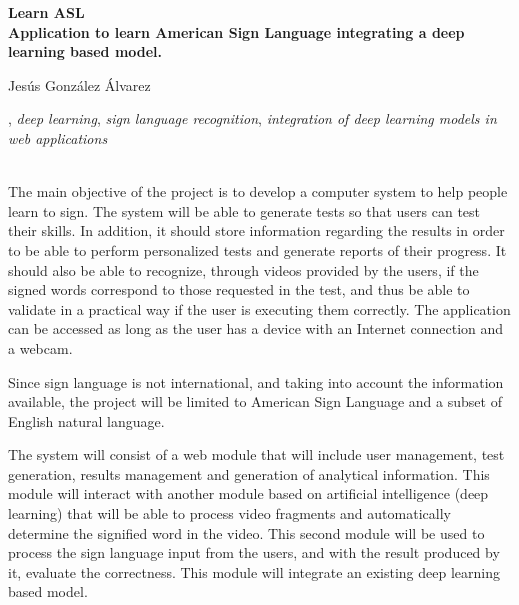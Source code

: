 \thispagestyle{empty}

\begin{center}
{\large\bfseries Learn ASL \\ Application to learn American Sign Language integrating a deep learning based model.}\\
\end{center}
\begin{center}
Jesús González Álvarez\\
\end{center}


\vspace{0.5cm}
, \textit{deep learning}, \textit{sign language recognition}, \textit{integration of deep learning models in web applications}
\vspace{0.7cm}

\\

\bigskip
The main objective of the project is to develop a computer system to help people learn to sign. The system will be able to generate tests so that users can test their skills. In addition, it should store information regarding the results in order to be able to perform personalized tests and generate reports of their progress. It should also be able to recognize, through videos provided by the users, if the signed words correspond to those requested in the test, and thus be able to validate in a practical way if the user is executing them correctly. The application can be accessed as long as the user has a device with an Internet connection and a webcam.

\bigskip
Since sign language is not international, and taking into account the information available, the project will be limited to American Sign Language and a subset of English natural language.

\bigskip
The system will consist of a web module that will include user management, test generation, results management and generation of analytical information. This module will interact with another module based on artificial intelligence (deep learning) that will be able to process video fragments and automatically determine the signified word in the video. This second module will be used to process the sign language input from the users, and with the result produced by it, evaluate the correctness. This module will integrate an existing deep learning based model.
	

